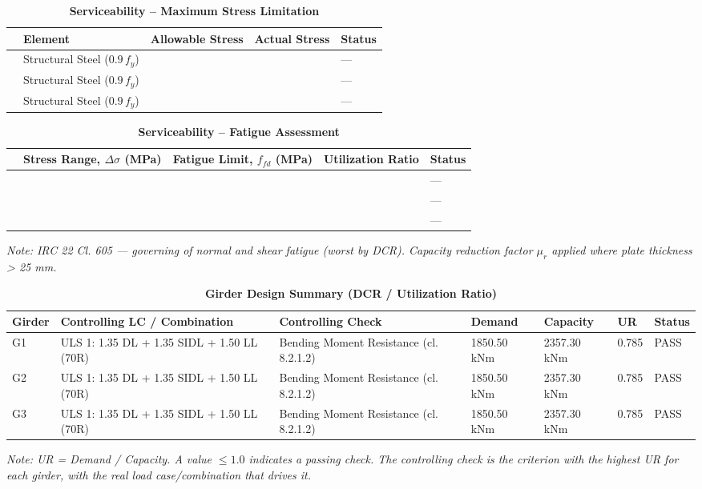 \documentclass[12pt,a4paper]{report}
\numberwithin{table}{chapter}
\numberwithin{figure}{chapter}
\begin{document}
\vspace{1em}
\begin{longtable}{|C{2.5cm}|L{3.5cm}|C{3.5cm}|>{\centering\arraybackslash}p{3.5cm}|C{2.5cm}|}
\caption{\textbf{Serviceability -- Maximum Stress Limitation}}
\hline
\textbf{} & \textbf{Element} & \textbf{Allowable Stress} & \textbf{Actual Stress} & \textbf{Status} \\[6pt]
\hline
{} & Structural Steel ($0.9\,f_y$) &  &  & --- \\[6pt]
\hline
{} & Structural Steel ($0.9\,f_y$) &  &  & --- \\[6pt]
\hline
{} & Structural Steel ($0.9\,f_y$) &  &  & --- \\[6pt]
\hline
\end{longtable}

\vspace{1em}
\begin{longtable}{|C{2.5cm}|C{3.5cm}|C{3.5cm}|>{\centering\arraybackslash}p{3.5cm}|C{2.5cm}|}
\caption{\textbf{Serviceability -- Fatigue Assessment}}
\hline
\textbf{} & \textbf{Stress Range, $\Delta\sigma$ (MPa)} & \textbf{Fatigue Limit, $f_{fd}$ (MPa)} & \textbf{Utilization Ratio} & \textbf{Status} \\[6pt]
\hline
{} &  &  &  & --- \\[6pt]
\hline
{} &  &  &  & --- \\[6pt]
\hline
{} &  &  &  & --- \\[6pt]
\hline
\end{longtable}
\noindent\textit{Note: IRC 22 Cl. 605 --- governing of normal and shear fatigue (worst by DCR). Capacity reduction factor $\mu_r$ applied where plate thickness > 25 mm.}

\vspace{1em}
\vspace{0.4em}
\begin{longtable}{|C{1.6cm}|>{\centering\arraybackslash}p{3.6cm}|C{2.4cm}|C{2.0cm}|C{2.1cm}|C{1.7cm}|C{1.5cm}|}
\caption{\textbf{Girder Design Summary (DCR / Utilization Ratio)}}
\hline
\textbf{Girder} & \textbf{Controlling LC / Combination} & \textbf{Controlling Check} & \textbf{Demand} & \textbf{Capacity} & \textbf{UR} & \textbf{Status} \\[6pt]
\hline
G1 & ULS 1:\allowbreak{} 1.35 DL + 1.35 SIDL + 1.50 LL (70R) & Bending Moment Resistance (cl. 8.2.1.2) & 1850.50 kNm & 2357.30 kNm & 0.785 & PASS \\[6pt]
\hline
G2 & ULS 1:\allowbreak{} 1.35 DL + 1.35 SIDL + 1.50 LL (70R) & Bending Moment Resistance (cl. 8.2.1.2) & 1850.50 kNm & 2357.30 kNm & 0.785 & PASS \\[6pt]
\hline
G3 & ULS 1:\allowbreak{} 1.35 DL + 1.35 SIDL + 1.50 LL (70R) & Bending Moment Resistance (cl. 8.2.1.2) & 1850.50 kNm & 2357.30 kNm & 0.785 & PASS \\[6pt]
\hline
\end{longtable}
\noindent\textit{Note: UR = Demand / Capacity. A value $\leq 1.0$ indicates a passing check. The controlling check is the criterion with the highest UR for each girder, with the real load case/combination that drives it.}
\end{document}
